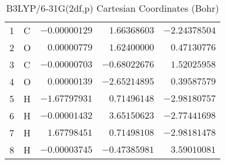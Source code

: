 \documentclass[10pt,oneside]{article}
\begin{document}
\begin{table}[h!]
\centering
\caption{B3LYP/6-31G(2df,p) Cartesian Coordinates (Bohr)}
\begin{tabular}{llrrr}
1  & C  & $-0.00000129$ & $ 1.66368603$ & $-2.24378504$ \\
2  & O  & $ 0.00000779$ & $ 1.62400000$ & $ 0.47130776$ \\
3  & C  & $-0.00000703$ & $-0.68022676$ & $ 1.52025958$ \\
4  & O  & $ 0.00000139$ & $-2.65214895$ & $ 0.39587579$ \\
5  & H  & $-1.67797931$ & $ 0.71496148$ & $-2.98180757$ \\
6  & H  & $-0.00001432$ & $ 3.65150623$ & $-2.77441698$ \\
7  & H  & $ 1.67798451$ & $ 0.71498108$ & $-2.98181478$ \\
8  & H  & $-0.00003745$ & $-0.47385981$ & $ 3.59010081$ \\
\end{tabular}
\end{table}

\clearpage
\end{document}
